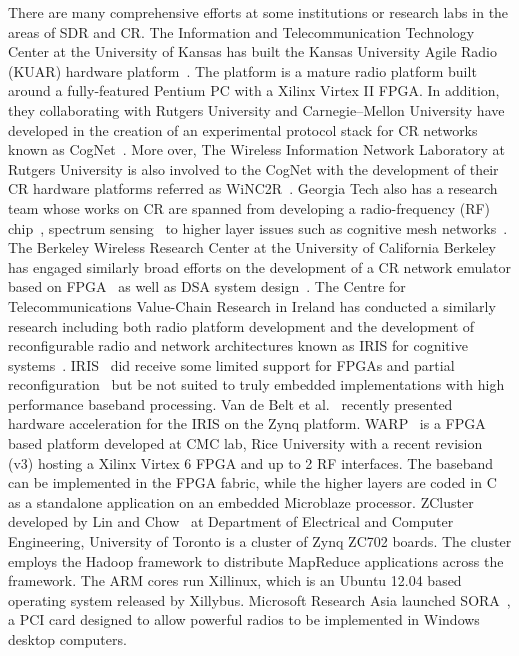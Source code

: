 There are many comprehensive efforts at some institutions or research labs in the areas of SDR and CR. 
The Information and Telecommunication Technology Center at the University of Kansas has built the Kansas University Agile Radio (KUAR) hardware platform~\cite{Minden2007}. 
The platform is a mature radio platform built around a fully-featured Pentium PC with a Xilinx Virtex II FPGA.
In addition, they collaborating with Rutgers University and Carnegie–Mellon University have developed in the creation of an experimental protocol stack for CR networks known as CogNet~\cite{Raychaudhuri2006}. 
More over, The Wireless Information Network Laboratory at Rutgers University is also involved to the CogNet with the development of their CR hardware platforms referred as WiNC2R~\cite{Miljanic2007}.
Georgia Tech also has a research team whose works on CR are spanned from developing a radio-frequency (RF) chip~\cite{Mukhopadhyay2005}, spectrum sensing~\cite{Ganesan2005} to higher layer issues such as cognitive mesh networks~\cite{Chowdhury2008}. 
The Berkeley Wireless Research Center at the University of California Berkeley has engaged similarly broad efforts on the development of a CR network emulator based on FPGA~\cite{So2008} as well as DSA system design~\cite{Mishra2006}.
The Centre for Telecommunications Value-Chain Research in Ireland has conducted a similarly research including both radio platform development and the development of reconfigurable radio and network architectures known as IRIS for cognitive systems~\cite{Sutton2006}. IRIS~\cite{sutton2010} did receive some limited support for FPGAs and partial reconfiguration~\cite{fahmy2009,lotze2009} but be not suited to truly embedded implementations with high performance baseband processing. Van de Belt et al.~\cite{Belt2013} recently presented hardware acceleration for the IRIS on the Zynq platform.
WARP~\cite{amiri2007} is a FPGA based platform developed at CMC lab, Rice University with a recent revision (v3) hosting a Xilinx Virtex 6 FPGA and up to 2 RF interfaces. The baseband can be implemented in the FPGA fabric, while the higher layers are coded in C as a standalone application on an embedded Microblaze processor.
ZCluster developed by Lin and Chow~\cite{Lin2013} at Department of Electrical and Computer Engineering, University of Toronto is a cluster of Zynq ZC702 boards. The cluster employs the Hadoop framework to distribute MapReduce applications across the framework. The ARM cores run Xillinux, which is an Ubuntu 12.04 based operating system released by Xillybus.
Microsoft Research Asia launched SORA~\cite{tan2011sora}, a PCI card designed to allow powerful radios to be implemented in Windows desktop computers.
